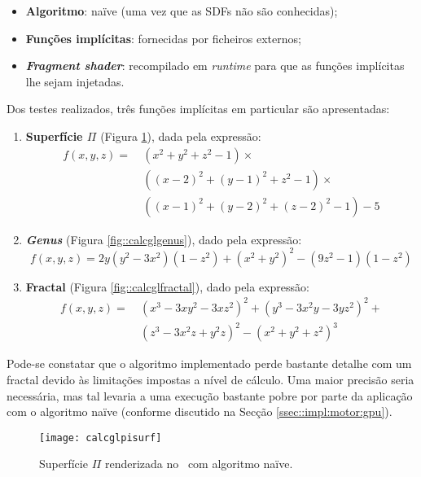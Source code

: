 \begin{itemize}
	\item \textbf{Algoritmo}: naïve (uma vez que as \acsp{SDF} não são conhecidas);
	\item \textbf{Funções implícitas}: fornecidas por ficheiros externos;
	\item \textbf{\itshape Fragment shader}: recompilado em \textit{runtime} para que as funções implícitas lhe sejam injetadas.
\end{itemize}


Dos testes realizados, três funções implícitas em particular são apresentadas:

\begin{enumerate}
	\item \textbf{Superfície $\Pi$} (Figura \ref{fig::calcglpisurf}), dada pela expressão:
	\begin{align*}
		f(x,y,z) = ~& \left(x^2 + y^2 + z^2 - 1\right) \times \\
	                & \left((x-2)^2 + (y-1)^2 + z^2 - 1\right) \times \\
		            & \left((x-1)^2 + (y-2)^2 + (z-2)^2 - 1\right) - 5
	\end{align*}

	\item \textbf{\textit{Genus}} (Figura \ref{fig::calcglgenus}), dado pela expressão:
	\begin{equation*}
		f(x,y,z) = 2y(y^2 - 3x^2)(1-z^2) + (x^2 + y^2)^2 - (9z^2 - 1)(1 - z^2)
	\end{equation*}

	\item \textbf{Fractal} (Figura \ref{fig::calcglfractal}), dado pela expressão:
	\begin{align*}
		f(x,y,z) =~ & (x^3 - 3xy^2 - 3xz^2)^2 + (y^3 - 3x^2y - 3yz^2)^2 + \\
		            & (z^3 - 3x^2z + y^2z)^2  - (x^2 + y^2 + z^2)^3
	\end{align*}
\end{enumerate}

Pode-se constatar que o algoritmo implementado perde bastante detalhe com um fractal devido às limitações impostas a nível de cálculo. Uma maior precisão seria necessária, mas tal levaria a uma execução bastante pobre por parte da aplicação com o algoritmo naïve (conforme discutido na Secção \ref{ssec::impl:motor:gpu}).

\begin{figure}[!hbp]
	\centering
	\texttt{[image: calcglpisurf]}
	\caption[Superfície $\Pi$ no \theapp~com algoritmo naïve]{Superfície $\Pi$ renderizada no \theapp~com algoritmo naïve.}
	\label{fig::calcglpisurf}
\end{figure}

